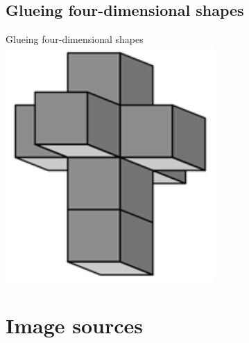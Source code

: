 \documentclass[12pt,compress,ngerman,utf8,t]{beamer}
\begin{document}

\subsection[Glueing]{Glueing four-dimensional shapes}

\begin{frame}{Glueing four-dimensional shapes}
  \centering
  \includegraphics[width=0.6\textwidth]{tesseract-net}
  \par
\end{frame}


\appendix

\section{Image sources}
\end{document}
